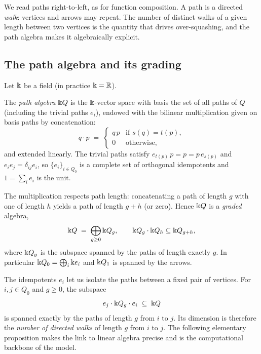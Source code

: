 We read paths right-to-left, as for function composition. A path is a directed
\emph{walk}: vertices and arrows may repeat. The number of distinct walks of a
given length between two vertices is the quantity that drives over-squashing, and
the path algebra makes it algebraically explicit.

\subsection{The path algebra and its grading}

Let $\Bbbk$ be a field (in practice $\Bbbk=\mathbb{R}$).

\begin{definition}
The \emph{path algebra} $\Bbbk Q$ is the $\Bbbk$-vector space with basis the set of all
paths of $Q$ (including the trivial paths $e_i$), endowed with the bilinear
multiplication given on basis paths by concatenation:
\[
  q\cdot p \;=\;
  \begin{cases}
    q\,p & \text{if } s(q)=t(p),\\[2pt]
    0 & \text{otherwise,}
  \end{cases}
\]
and extended linearly. The trivial paths satisfy $e_{t(p)}\,p=p=p\,e_{s(p)}$ and
$e_ie_j=\delta_{ij}e_i$, so $\{e_i\}_{i\in Q_0}$ is a complete set of orthogonal
idempotents and $1=\sum_{i}e_i$ is the unit.
\end{definition}

The multiplication respects path length: concatenating a path of length $g$ with
one of length $h$ yields a path of length $g+h$ (or zero). Hence $\Bbbk Q$ is a
\emph{graded} algebra,
\[
  \Bbbk Q \;=\; \bigoplus_{g\ge 0}\Bbbk Q_g,
  \qquad \Bbbk Q_g\cdot \Bbbk Q_h \subseteq \Bbbk Q_{g+h},
\]
where $\Bbbk Q_g$ is the subspace spanned by the paths of length exactly $g$. In
particular $\Bbbk Q_0=\bigoplus_i \Bbbk e_i$ and $\Bbbk Q_1$ is spanned by the arrows.

The idempotents $e_i$ let us isolate the paths between a fixed pair of vertices.
For $i,j\in Q_0$ and $g\ge 0$, the subspace
\[
  e_j\cdot \Bbbk Q_g\cdot e_i \;\subseteq\; \Bbbk Q
\]
is spanned exactly by the paths of length $g$ from $i$ to $j$. Its dimension is
therefore the \emph{number of directed walks} of length $g$ from $i$ to $j$. The
following elementary proposition makes the link to linear algebra precise and is
the computational backbone of the model.

